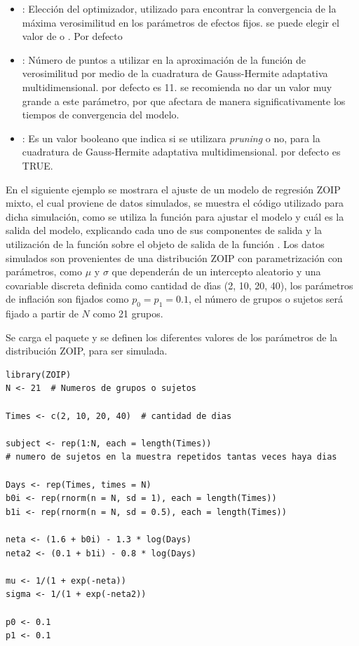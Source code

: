 \begin{itemize}[noitemsep, nolistsep]
\item {}: Elecci\'{o}n del optimizador, utilizado para encontrar la convergencia de la m\'{a}xima verosimilitud en los par\'{a}metros de efectos fijos. se puede elegir el valor de  o . Por defecto 
\item {}: N\'{u}mero de puntos a utilizar en la aproximaci\'{o}n de la funci\'{o}n de verosimilitud por medio de la cuadratura de Gauss-Hermite adaptativa multidimensional. por defecto es 11. se recomienda no dar un valor muy grande a este par\'{a}metro, por que afectara de manera significativamente los tiempos de convergencia del modelo.
\item {}: Es un valor booleano que indica si se utilizara \textit{pruning} o no, para la cuadratura de Gauss-Hermite adaptativa multidimensional. por defecto es TRUE.

\end{itemize}

En el siguiente ejemplo se mostrara el ajuste de un modelo de regresi\'{o}n ZOIP mixto, el cual proviene de datos simulados, se muestra el c\'{o}digo utilizado para dicha simulaci\'{o}n, como se utiliza la funci\'{o}n  para ajustar el modelo y cu\'{a}l es la salida del modelo, explicando cada uno de sus componentes de salida y la utilizaci\'{o}n de la funci\'{o}n  sobre el objeto de salida de la funci\'{o}n . Los datos simulados son provenientes de una distribuci\'{o}n ZOIP con parametrizaci\'{o}n \cite{Stasinopoulos2} con par\'{a}metros, como $\mu$ y $\sigma$ que depender\'{a}n de un intercepto aleatorio y una covariable discreta definida como cantidad de d\'{\i}as (2, 10, 20, 40), los par\'{a}metros de inflaci\'{o}n son fijados como $p_0=p_1=0.1$, el n\'{u}mero de grupos o sujetos ser\'{a} fijado a partir de $N$ como 21 grupos.

Se carga el paquete  y se definen los diferentes valores de los par\'{a}metros de la distribuci\'{o}n ZOIP, para ser simulada.
\begin{verbatim}
library(ZOIP)
N <- 21  # Numeros de grupos o sujetos

Times <- c(2, 10, 20, 40)  # cantidad de dias

subject <- rep(1:N, each = length(Times))
# numero de sujetos en la muestra repetidos tantas veces haya dias

Days <- rep(Times, times = N)
b0i <- rep(rnorm(n = N, sd = 1), each = length(Times))
b1i <- rep(rnorm(n = N, sd = 0.5), each = length(Times))

neta <- (1.6 + b0i) - 1.3 * log(Days)
neta2 <- (0.1 + b1i) - 0.8 * log(Days)

mu <- 1/(1 + exp(-neta))
sigma <- 1/(1 + exp(-neta2))

p0 <- 0.1
p1 <- 0.1
\end{verbatim}

